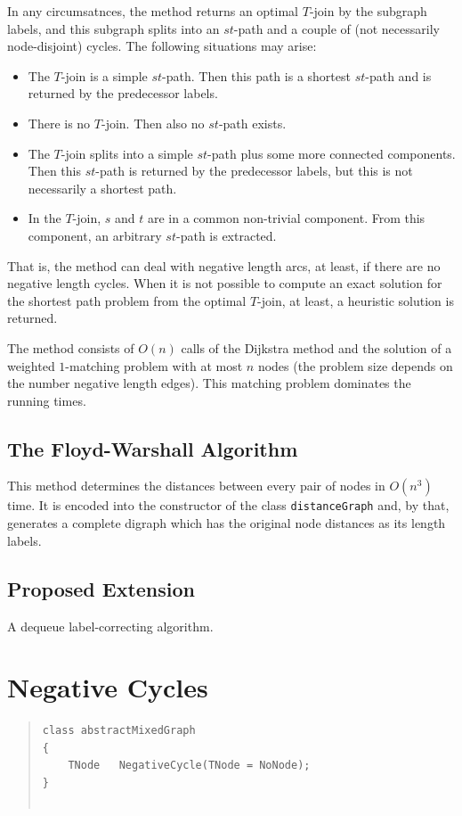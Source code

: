 \documentclass[a4paper,11pt,twoside]{book}
\begin{document}
\begin{multicols}{2}
In any circumsatnces, the method returns an optimal $T$-join by the subgraph
labels, and this subgraph splits into an $st$-path and a couple of (not
necessarily node-disjoint) cycles. The following situations
may arise:
\begin{itemize}
\item The $T$-join is a simple $st$-path. Then this path is a shortest $st$-path
    and is returned by the predecessor labels.
\item There is no $T$-join. Then also no $st$-path exists.
\item The $T$-join splits into a simple $st$-path plus some more connected
    components. Then this $st$-path is returned by the predecessor labels,
    but this is not necessarily a shortest path.
\item In the $T$-join, $s$ and $t$ are in a common non-trivial component.
    From this component, an arbitrary $st$-path is extracted.
\end{itemize}
That is, the method can deal with negative length arcs, at least, if there are
no negative length cycles. When it is not possible to compute an exact solution
for the shortest path problem from the optimal $T$-join, at least, a heuristic
solution is returned.

The method consists of $O(n)$ calls of the Dijkstra method and the solution of
a weighted $1$-matching problem with at most $n$ nodes (the problem size depends
on the number negative length edges). This matching problem dominates the running
times.


\subsection{The Floyd-Warshall Algorithm}
This method determines the distances between every pair of nodes in $O(n^3)$
time. It is encoded into the constructor of the class \verb/distanceGraph/
and, by that, generates a complete digraph which has the original node
distances as its length labels.


\subsection{Proposed Extension}
A dequeue label-correcting algorithm.



\label{slb620}
\section{Negative Cycles}
\methods
\begin{quote}
\begin{verbatim}
class abstractMixedGraph
{
    TNode   NegativeCycle(TNode = NoNode);
}


\end{verbatim}
\end{quote}
\end{multicols}
\end{document}
